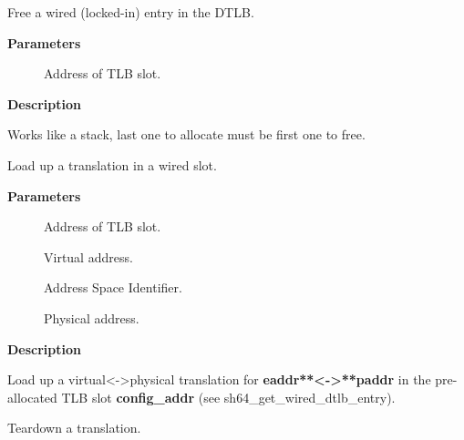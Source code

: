 \documentclass[a4paper,8pt,english]{sphinxmanual}
\begin{document}
\begin{fulllineitems}
\label{sh/index:c.sh64_put_wired_dtlb_entry}
Free a wired (locked-in) entry in the DTLB.

\end{fulllineitems}


\textbf{Parameters}
\begin{description}
\item[{}] \leavevmode
Address of TLB slot.

\end{description}

\textbf{Description}

Works like a stack, last one to allocate must be first one to free.

\begin{fulllineitems}
\label{sh/index:c.sh64_setup_tlb_slot}
Load up a translation in a wired slot.

\end{fulllineitems}


\textbf{Parameters}
\begin{description}
\item[{}] \leavevmode
Address of TLB slot.

\item[{}] \leavevmode
Virtual address.

\item[{}] \leavevmode
Address Space Identifier.

\item[{}] \leavevmode
Physical address.

\end{description}

\textbf{Description}

Load up a virtual\textless{}-\textgreater{}physical translation for \textbf{eaddr**\textless{}-\textgreater{}**paddr} in the
pre-allocated TLB slot \textbf{config\_addr} (see sh64\_get\_wired\_dtlb\_entry).

\begin{fulllineitems}
\label{sh/index:c.sh64_teardown_tlb_slot}
Teardown a translation.

\end{fulllineitems}
\end{document}
